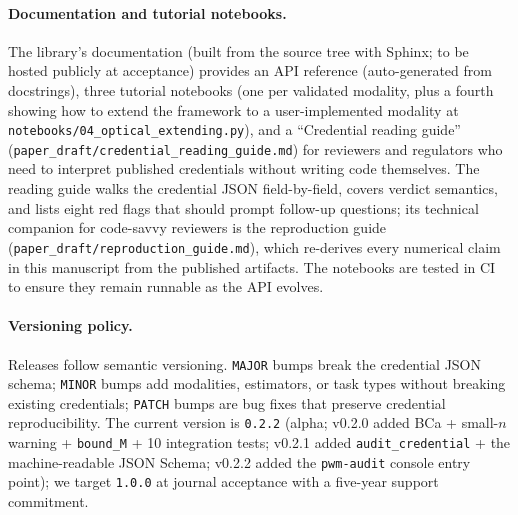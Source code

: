 \documentclass[twoside,11pt]{article}
\begin{document}
\paragraph{Documentation and tutorial notebooks.} The library's documentation (built from the source tree with Sphinx; to be hosted publicly at acceptance) provides an API reference (auto-generated from docstrings), three tutorial notebooks (one per validated modality, plus a fourth showing how to extend the framework to a user-implemented modality at \texttt{notebooks/04\_optical\_extending.py}), and a ``Credential reading guide'' (\texttt{paper\_draft/credential\_reading\_guide.md}) for reviewers and regulators who need to interpret published credentials without writing code themselves. The reading guide walks the credential JSON field-by-field, covers verdict semantics, and lists eight red flags that should prompt follow-up questions; its technical companion for code-savvy reviewers is the reproduction guide (\texttt{paper\_draft/reproduction\_guide.md}), which re-derives every numerical claim in this manuscript from the published artifacts. The notebooks are tested in CI to ensure they remain runnable as the API evolves.

\paragraph{Versioning policy.} Releases follow semantic versioning. \texttt{MAJOR} bumps break the credential JSON schema; \texttt{MINOR} bumps add modalities, estimators, or task types without breaking existing credentials; \texttt{PATCH} bumps are bug fixes that preserve credential reproducibility. The current version is \texttt{0.2.2} (alpha; v0.2.0 added BCa + small-$n$ warning + \texttt{bound\_M} + 10 integration tests; v0.2.1 added \texttt{audit\_credential} + the machine-readable JSON Schema; v0.2.2 added the \texttt{pwm-audit} console entry point); we target \texttt{1.0.0} at journal acceptance with a five-year support commitment.
\end{document}
